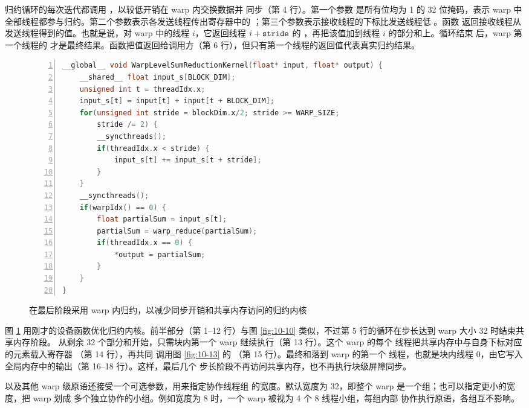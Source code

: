 归约循环的每次迭代都调用 ，以较低开销在 warp 内交换数据并
同步（第 4 行）。第一个参数  是所有位均为 1 的 32 位掩码，表示
warp 中全部线程都参与归约。第二个参数表示各发送线程传出寄存器中的
；第三个参数表示接收线程的下标比发送线程低 。函数
返回接收线程从发送线程得到的值。也就是说，对 warp 中的线程 $i$，它返回线程
$i+\code{stride}$ 的 ，再把该值加到线程 $i$ 的部分和上。循环结束
后，warp 第一个线程的  才是最终结果。函数把值返回给调用方（第 6
行），但只有第一个线程的返回值代表真实归约结果。

\begin{figure}[htbp]
  \centering
  \begin{minipage}{0.97\textwidth}
  \begin{lstlisting}[language=C++,numbers=left]
__global__ void WarpLevelSumReductionKernel(float* input, float* output) {
    __shared__ float input_s[BLOCK_DIM];
    unsigned int t = threadIdx.x;
    input_s[t] = input[t] + input[t + BLOCK_DIM];
    for(unsigned int stride = blockDim.x/2; stride >= WARP_SIZE;
        stride /= 2) {
        __syncthreads();
        if(threadIdx.x < stride) {
            input_s[t] += input_s[t + stride];
        }
    }
    __syncthreads();
    if(warpIdx() == 0) {
        float partialSum = input_s[t];
        partialSum = warp_reduce(partialSum);
        if(threadIdx.x == 0) {
            *output = partialSum;
        }
    }
}
  \end{lstlisting}
  \end{minipage}
  \caption{在最后阶段采用 warp 内归约，以减少同步开销和共享内存访问的归约内核}
  \label{fig:10-14}
\end{figure}

图 \ref{fig:10-14} 用刚才的设备函数优化归约内核。前半部分（第 1--12 行）与图
\ref{fig:10-10} 类似，不过第 5 行的循环在步长达到 warp 大小 32 时结束共享内存阶段。
从剩余 32 个部分和开始，只需块内第一个 warp 继续执行（第 13 行）。这个 warp 的每个
线程把共享内存中与自身下标对应的元素载入寄存器 （第 14 行），再共同
调用图 \ref{fig:10-13} 的 （第 15 行）。最终和落到 warp 的第一个
线程，也就是块内线程 0，由它写入全局内存中的输出（第 16--18 行）。这样，最后几个
步长阶段不再访问共享内存，也不再执行块级屏障同步。

 以及其他 warp 级原语还接受一个可选参数，用来指定协作线程组
的宽度。默认宽度为 32，即整个 warp 是一个组；也可以指定更小的宽度，把 warp 划成
多个独立协作的小组。例如宽度为 8 时，一个 warp 被视为 4 个 8 线程小组，每组内部
协作执行原语，各组互不影响。

